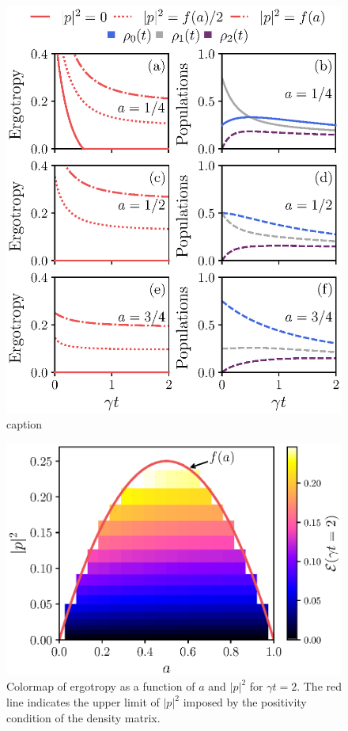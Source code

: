 \documentclass[%
reprint,
superscriptaddress,
amsmath,amssymb,
aps,
pra,
]{revtex4-2}
\begin{document}
\begin{figure}[H]
\includegraphics[width=\linewidth]{fig5.eps}
\caption{caption}
\label{fig5}
\end{figure}


\begin{figure}[H]
\includegraphics[width=\linewidth]{fig6.eps}
\caption{Colormap of ergotropy as a function of $a$ and $|p|^2$ for $\gamma t = 2$. The red line indicates the upper limit of $|p|^2$ imposed by the positivity condition of the density matrix.}
\label{fig6}
\end{figure}
\end{document}
